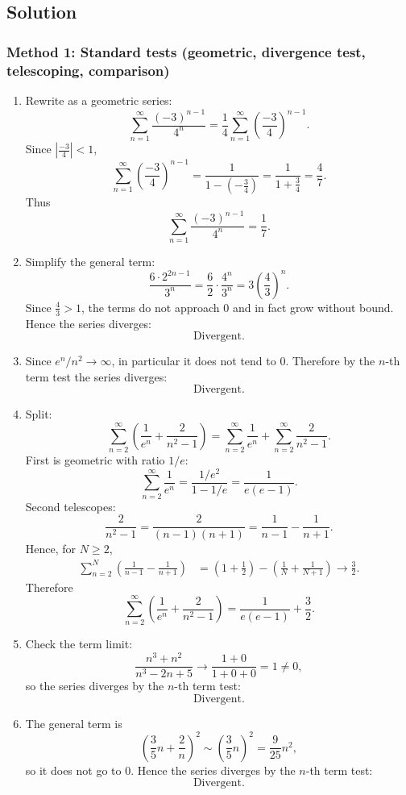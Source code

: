 \documentclass[12pt]{article}
\begin{document}
\subsection*{Solution}

\subsubsection*{Method 1: Standard tests (geometric, divergence test, telescoping, comparison)}

\begin{enumerate}[label=(\roman*)]
\item Rewrite as a geometric series:
\[
\sum_{n=1}^{\infty}\frac{(-3)^{n-1}}{4^{n}}
=\frac{1}{4}\sum_{n=1}^{\infty}\left(\frac{-3}{4}\right)^{n-1}.
\]
Since \(\left|\frac{-3}{4}\right|<1\),
\[
\sum_{n=1}^{\infty}\left(\frac{-3}{4}\right)^{n-1}=\frac{1}{1-\left(-\frac{3}{4}\right)}=\frac{1}{1+\frac{3}{4}}=\frac{4}{7}.
\]
Thus
\[
\boxed{\sum_{n=1}^{\infty}\frac{(-3)^{n-1}}{4^{n}}=\frac{1}{7}.}
\]

\item Simplify the general term:
\[
\frac{6\cdot 2^{2n-1}}{3^{n}}
=\frac{6}{2}\cdot \frac{4^{n}}{3^{n}}
=3\left(\frac{4}{3}\right)^{n}.
\]
Since \(\frac{4}{3}>1\), the terms do not approach \(0\) and in fact grow without bound. Hence the series diverges:
\[
\boxed{\text{Divergent.}}
\]

\item Since \(e^{n}/n^{2}\to \infty\), in particular it does not tend to \(0\). Therefore by the \(n\)-th term test the series diverges:
\[
\boxed{\text{Divergent.}}
\]

\item Split:
\[
\sum_{n=2}^{\infty}\left(\frac{1}{e^{n}}+\frac{2}{n^{2}-1}\right)
=\sum_{n=2}^{\infty}\frac{1}{e^{n}}+\sum_{n=2}^{\infty}\frac{2}{n^{2}-1}.
\]
First is geometric with ratio \(1/e\):
\[
\sum_{n=2}^{\infty}\frac{1}{e^{n}}=\frac{1/e^{2}}{1-1/e}=\frac{1}{e(e-1)}.
\]
Second telescopes:
\[
\frac{2}{n^{2}-1}=\frac{2}{(n-1)(n+1)}=\frac{1}{n-1}-\frac{1}{n+1}.
\]
Hence, for \(N\ge 2\),
\begin{align*}
\sum_{n=2}^{N}\left(\frac{1}{n-1}-\frac{1}{n+1}\right)
&=\left(1+\frac{1}{2}\right)-\left(\frac{1}{N}+\frac{1}{N+1}\right)
\to \frac{3}{2}.
\end{align*}
Therefore
\[
\boxed{\sum_{n=2}^{\infty}\left(\frac{1}{e^{n}}+\frac{2}{n^{2}-1}\right)
=\frac{1}{e(e-1)}+\frac{3}{2}.}
\]

\item Check the term limit:
\[
\frac{n^{3}+n^{2}}{n^{3}-2n+5}\to \frac{1+0}{1+0+0}=1\neq 0,
\]
so the series diverges by the \(n\)-th term test:
\[
\boxed{\text{Divergent.}}
\]

\item The general term is
\[
\left(\frac{3}{5}n+\frac{2}{n}\right)^2 \sim \left(\frac{3}{5}n\right)^2=\frac{9}{25}n^2,
\]
so it does not go to \(0\). Hence the series diverges by the \(n\)-th term test:
\[
\boxed{\text{Divergent.}}
\]
\end{enumerate}
\end{document}
